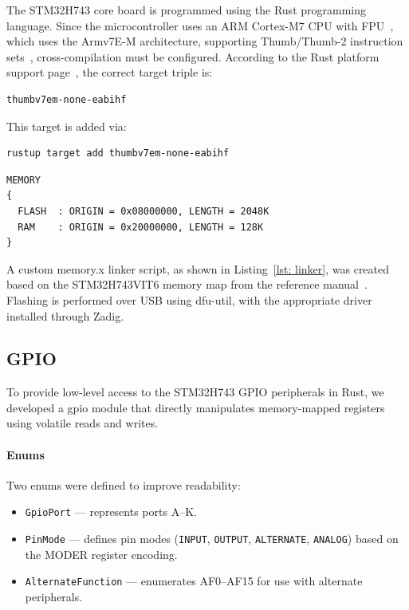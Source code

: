 \documentclass[12pt,a4paper]{article}
\begin{document}
The STM32H743 core board is programmed using the Rust programming language. 
Since the microcontroller uses an ARM Cortex-M7 CPU with FPU~\cite{zephyr}, which uses the Armv7E-M architecture, supporting Thumb/Thumb-2 instruction sets~\cite{arm}, cross-compilation must be configured. 
According to the Rust platform support page~\cite{rust-platform}, the correct target triple is:

\begin{verbatim}
thumbv7em-none-eabihf
\end{verbatim}
This target is added via:
\begin{verbatim}
rustup target add thumbv7em-none-eabihf
\end{verbatim}

\begin{lstlisting}[caption={STM32H743VIT6 Linker Script}, label={lst: linker}]
MEMORY
{
  FLASH  : ORIGIN = 0x08000000, LENGTH = 2048K
  RAM    : ORIGIN = 0x20000000, LENGTH = 128K
}

\end{lstlisting}

A custom memory.x linker script, as shown in Listing~\ref{lst: linker}, was created based on the STM32H743VIT6 
memory map from the reference manual~\cite{ref-manual}. 
Flashing is performed over USB using dfu-util, 
with the appropriate driver installed through Zadig.

\subsection{GPIO}

To provide low-level access to the STM32H743 GPIO peripherals in Rust, 
we developed a gpio module that directly manipulates memory-mapped 
registers using volatile reads and writes.

\paragraph{Enums} 
Two enums were defined to improve readability:
\begin{itemize}
    \item \texttt{GpioPort} --- represents ports A--K.
    \item \texttt{PinMode} --- defines pin modes (\texttt{INPUT}, \texttt{OUTPUT}, 
          \texttt{ALTERNATE}, \texttt{ANALOG}) based on the MODER register encoding.
    \item \texttt{AlternateFunction} --- enumerates AF0--AF15 for use with alternate peripherals.
\end{itemize}
\end{document}
